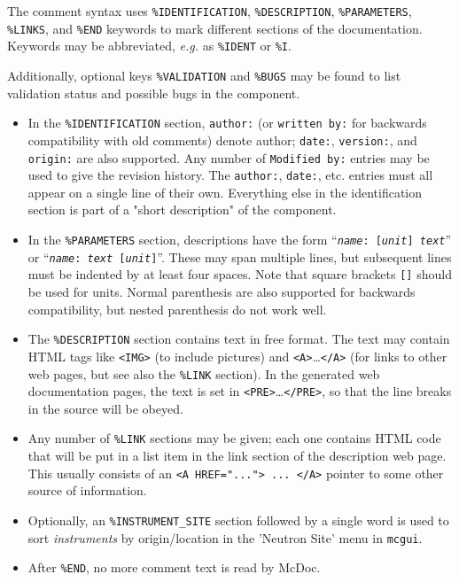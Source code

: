 The comment syntax uses \verb+%IDENTIFICATION+, \verb+%DESCRIPTION+,
\verb+%PARAMETERS+, \verb+%LINKS+, and \verb+%END+
keywords to mark different sections of the documentation. Keywords may
be abbreviated, \textit{e.g.} as \verb+%IDENT+ or \verb+%I+.

Additionally, optional keys \verb+%VALIDATION+ and \verb+%BUGS+ may be found to list validation status and possible bugs in the component.

\begin{itemize}
\item In the \verb+%IDENTIFICATION+
  section, \verb+author:+ (or \verb+written by:+ for backwards
  compatibility with old comments) denote author; \verb+date:+,
  \verb+version:+, and \verb+origin:+ are also supported. Any number of
  \verb+Modified by:+ entries may be used to give the revision history.
  The \verb+author:+, \verb+date:+, etc. entries must all
  appear on a single line of their own. Everything else in the
  identification section is part of a "short description" of the
  component.
\item In the \verb+%PARAMETERS+
  section, descriptions have the form
  \hbox{``\texttt{{\it name\/}:~[{\it unit\/}] {\it text\/}}''}
  or \hbox{``\texttt{{\it name\/}:~{\it text\/} [{\it unit\/}]}''}.
  These may span multiple lines, but subsequent lines must be
  indented by at least four spaces. Note that square brackets \verb+[]+ should
  be used for units. Normal parenthesis are also supported for backwards
  compatibility, but nested parenthesis do not work well.
\item The \verb+%DESCRIPTION+
  section contains text in free format. The text may contain HTML tags
  like \verb+<IMG>+ (to include pictures) and
  \verb+<A>+\ldots\verb+</A>+
  (for links to other web pages, but see also the \verb+%LINK+
  section). In the generated web documentation pages, the text is set in
  \verb+<PRE>+\ldots\verb+</PRE>+, so that the line breaks in the source
  will be obeyed.
\item Any number of \verb+%LINK+
  sections may be given; each one contains HTML code that will be put in
  a list item in the link section of the description web page. This
  usually consists of an \verb+<A HREF="..."> ... </A>+ pointer to some
  other source of information.
\item Optionally, an \verb+%INSTRUMENT_SITE+ section followed by a single word is used to sort \emph{instruments} by origin/location in the 'Neutron Site' menu in \verb+mcgui+.
\item After \verb+%END+, no more comment text is read by McDoc.
\end{itemize}
